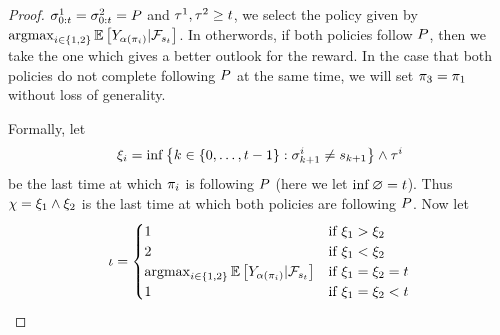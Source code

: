 \begin{proof}
    \(
        \sigma_{0:t}^1
        =
        \sigma_{0:t}^2
        =
        P
    \)
    and $\tau^1,\tau^2\geq t$, we select the policy
    given by 
    \(
        \operatorname*{argmax}_{
            i\in\left\{1,2\right\}
        }
        \mathbb{E}\left[
            Y_{
                \alpha\left(\pi_i\right)
            }
            | \mathcal{F}_{s_{t}}
        \right]
    \). 
    In otherwords, if both policies follow $P$, then we 
    take the one which gives a better outlook for the reward. In the 
    case that both policies do not complete following $P$ at the
    same time, we will set 
    \(
        \pi_3
        =
        \pi_1
    \)
    without loss of generality.

    Formally, let 
    \begin{align*}
        \xi_{i}
        =
        \inf\left\{
            k\in\left\{
                0,\ldots,t-1
            \right\}
            :
            \sigma_{k+1}^i
            \neq
            s_{k+1}
        \right\}
        \wedge
        \tau^i
    \end{align*}  
    be the last time at which $\pi_i$ is following $P$
    (here we let $\inf\varnothing=t$). 
    Thus 
    \(
        \chi
        =
        \xi_{1}
        \wedge
        \xi_{2}
    \)
    is the last time at which both policies are following $P$.
    Now let 
    \begin{align*}
        \iota
        =
        \begin{cases}
            1
            & 
            \text{if } \xi_{1} > \xi_{2}
            \\
            2
            & 
            \text{if } \xi_{1} < \xi_{2}
            \\
            \operatorname*{argmax}_{
                i\in\left\{1,2\right\}
            }
            \mathbb{E}\left[
                Y_{
                    \alpha\left(\pi_i\right)
                }
                | \mathcal{F}_{s_{t}}
            \right]
            & 
            \text{if } \xi_{1} = \xi_{2} = t
            \\
            1
            & 
            \text{if } \xi_{1} = \xi_{2} <t
        \end{cases}  
    \end{align*}  

\end{proof}
